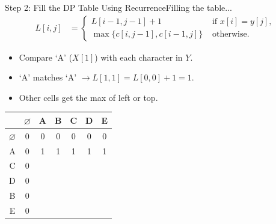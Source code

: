 \documentclass{beamer}
\begin{document}
\begin{frame}{Step 2: Fill the DP Table Using Recurrence}{Filling the table...}
    \vspace{-10mm}
    \scriptsize
    \begin{equation*}
        \begin{align*}
            L[i, j] &=
                        \begin{cases}
                            L[i - 1, j - 1] + 1 & \text{ if } x[i] = y[j] \text{, } \\
                            \max \{ c[i, j - 1], c[i - 1, j] \} & \text{ otherwise.}
                        \end{cases}
        \end{align*}
    \end{equation*}
    \begin{itemize}
        \item Compare `A' ($X[1]$) with each character in $Y$.
        \item `A' matches `A' $\longrightarrow L[1,1] = L[0,0] + 1 = 1$.
        \item Other cells get the max of left or top.
    \end{itemize}
    \vspace{6mm}
    \normalsize
    \centering
    \begin{tabular}{|c|c|c|c|c|c|c|} \hline
                      & $\varnothing$ & A & B & C & D & E \\ \hline
        $\varnothing$ &        0      & 0 & 0 & 0 & 0 & 0 \\ \hline
               A      &        0      & 1 & 1 & 1 & 1 & 1 \\ \hline
               C      &        0      &   &   &   &   &   \\ \hline
               D      &        0      &   &   &   &   &   \\ \hline
               B      &        0      &   &   &   &   &   \\ \hline
               E      &        0      &   &   &   &   &   \\ \hline
    \end{tabular}
\end{frame}
\end{document}
